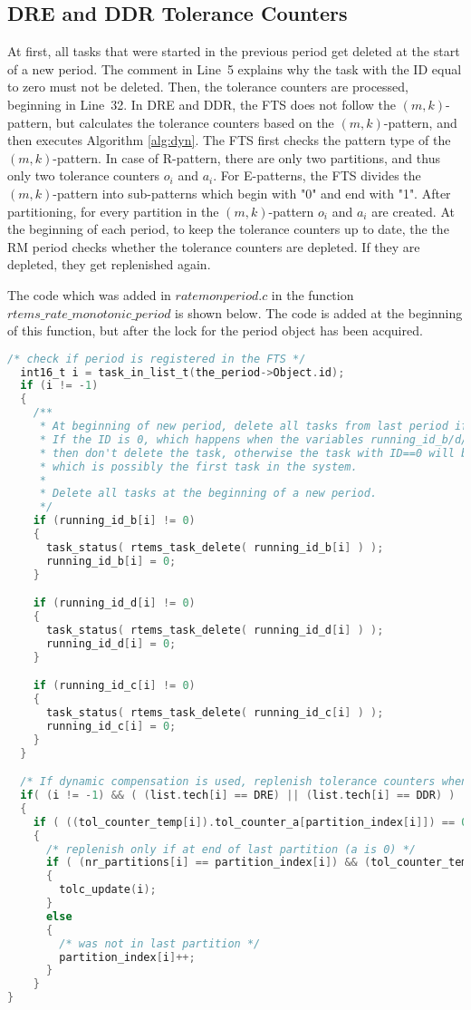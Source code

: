 \subsection{DRE and DDR Tolerance Counters}
At first, all tasks that were started in the previous period get deleted at the start of a new period. The comment in Line~5 explains why the task with the ID equal to zero must not be deleted. Then, the tolerance counters are processed, beginning in Line~32. In DRE and DDR, the FTS does not follow the $(m,k)$-pattern, but calculates the tolerance counters based on the $(m,k)$-pattern, and then executes Algorithm \ref{alg:dyn}. The FTS first checks the pattern type of the $(m,k)$-pattern. In case of R-pattern, there are only two partitions, and thus only two tolerance counters $o_i$ and $a_i$. For E-patterns, the FTS divides the $(m,k)$-pattern into sub-patterns which begin with "0" and end with "1". After partitioning, for every partition in the $(m,k)$-pattern $o_i$ and $a_i$ are created.
At the beginning of each period, to keep the tolerance counters up to date, the the RM period checks whether the tolerance counters are depleted. If they are depleted, they get replenished again. 

The code which was added in $ratemonperiod.c$ in the function $rtems\_rate\_monotonic\_period$ is shown below. The code is added at the beginning of this function, but after the lock for the period object has been acquired. 

\begin{lstlisting}[language=C]
  /* check if period is registered in the FTS */
  int16_t i = task_in_list_t(the_period->Object.id);
  if (i != -1)
  {
    /** 
     * At beginning of new period, delete all tasks from last period if their ID is not 0.
     * If the ID is 0, which happens when the variables running_id_b/d/c are not set at all, or set to 0
     * then don't delete the task, otherwise the task with ID==0 will be deleted,
     * which is possibly the first task in the system.
     *
     * Delete all tasks at the beginning of a new period.
     */
    if (running_id_b[i] != 0)
    {
      task_status( rtems_task_delete( running_id_b[i] ) );
      running_id_b[i] = 0;
    }

    if (running_id_d[i] != 0)
    {
      task_status( rtems_task_delete( running_id_d[i] ) );
      running_id_d[i] = 0;
    }

    if (running_id_c[i] != 0)
    {
      task_status( rtems_task_delete( running_id_c[i] ) );
      running_id_c[i] = 0;
    }
  }

  /* If dynamic compensation is used, replenish tolerance counters when they are depleted */
  if( (i != -1) && ( (list.tech[i] == DRE) || (list.tech[i] == DDR) )  )
  {
    if ( ((tol_counter_temp[i]).tol_counter_a[partition_index[i]]) == 0)
    {
      /* replenish only if at end of last partition (a is 0) */
      if ( (nr_partitions[i] == partition_index[i]) && (tol_counter_temp[i].tol_counter_a[nr_partitions[i]] == 0) )
      {
        tolc_update(i);
      }
      else
      {
        /* was not in last partition */
        partition_index[i]++;
      }
    }
}
\end{lstlisting}


